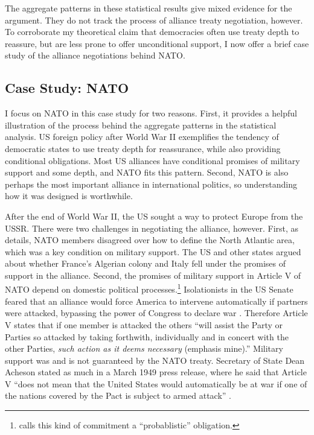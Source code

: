 \documentclass[12pt]{article}
\begin{document}
The aggregate patterns in these statistical results give mixed evidence for the argument. 
They do not track the process of alliance treaty negotiation, however. 
To corroborate my theoretical claim that democracies often use treaty depth to reassure, but are less prone to offer unconditional support, I now offer a brief case study of the alliance negotiations behind NATO. 


\subsection{Case Study: NATO}


I focus on NATO in this case study for two reasons. 
First, it provides a helpful illustration of the process behind the aggregate patterns in the statistical analysis. 
US foreign policy after World War II exemplifies the tendency of democratic states to use treaty depth for reassurance, while also providing conditional obligations.  
Most US alliances have conditional promises of military support and some depth, and NATO fits this pattern.
Second, NATO is also perhaps the most important alliance in international politics, so understanding how it was designed is worthwhile. 


After the end of World War II, the US sought a way to protect Europe from the USSR. 
There were two challenges in negotiating the alliance, however.
First, as \citet{Poast2019a} details, NATO members disagreed over how to define the North Atlantic area, which was a key condition on military support. 
The US and other states argued about whether France's Algerian colony and Italy fell under the promises of support in the alliance. 
Second, the promises of military support in Article V of NATO depend on domestic political processes.\footnote{\citet{Benson2012} calls this kind of commitment a ``probablistic'' obligation.} 
Isolationists in the US Senate feared that an alliance would force America to intervene automatically if partners were attacked, bypassing the power of Congress to declare war \citep[pg. 280-1]{Acheson1969}.
Therefore Article V states that if one member is attacked the others ``will assist the Party or Parties so attacked by taking forthwith, individually and in concert with the other Parties, \emph{such action as it deems necessary} (emphasis mine).'' 
Military support was and is not guaranteed by the NATO treaty. 
Secretary of State Dean Acheson stated as much in a March 1949 press release, where he said that Article V ``does not mean that the United States would automatically be at war if one of the nations covered by the Pact is subject to armed attack'' \citep{Acheson1949}. 
\end{document}
